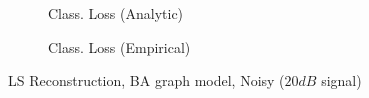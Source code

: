 \begin{figure}
\begin{subfigure}[T]{0.5\columnwidth}
    \caption{Class. Loss (Analytic)}
    \label{subsubfig:BA_noisy_sgc_LS_class_anal}
    \end{subfigure}%
    \begin{subfigure}[T]{0.5\columnwidth}
    \caption{Class. Loss (Empirical)}%
    \label{subsubfig:BA_noisy_sgc_LS_class_emp}
    \end{subfigure}%
    \caption{LS Reconstruction, BA graph model, Noisy ($20dB$ signal)}
    \vspace{-0.19cm}
\label{subfig:BA_noisy_vs_noisy_sgc_LS}
\end{figure}


